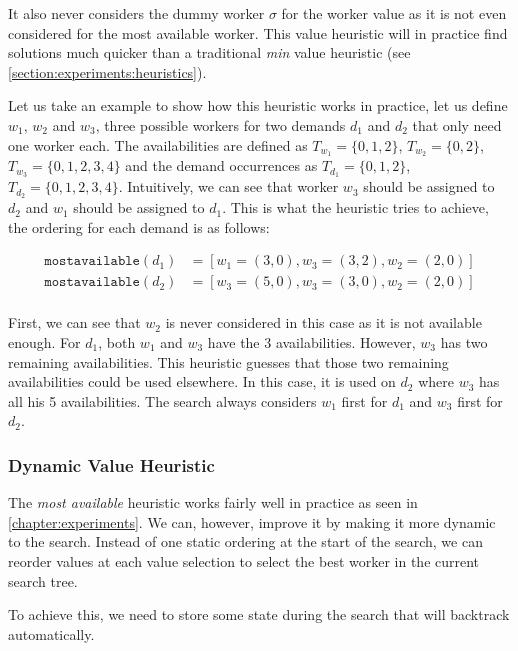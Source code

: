 \documentclass[../../thesis.tex]{subfiles}
\begin{document}
It also never considers the dummy worker $\sigma$ for the worker value as it is not even considered 
for the most available worker. This value heuristic will in practice find solutions much quicker than a traditional \emph{min} value heuristic 
(see \autoref{section:experiments:heuristics}).

Let us take an example to show how this heuristic works in practice, let us define 
$w_1$, $w_2$ and $w_3$, three possible workers for two demands $d_1$ and $d_2$ that only need one worker each.
The availabilities are defined as
$T_{w_1} = \{ 0, 1, 2 \}$, $T_{w_2} = \{ 0, 2 \}$, $T_{w_3} = \{ 0, 1, 2, 3, 4\}$ and the demand occurrences as 
$T_{d_1} = \{ 0, 1, 2 \}$, $T_{d_2} = \{ 0, 1, 2, 3, 4 \}$. Intuitively, we can see that worker 
$w_3$ should be assigned to $d_2$ and $w_1$ should be assigned to $d_1$. This is what the heuristic tries to achieve, the ordering for each demand is as follows:

\begin{align*}
  \texttt{mostavailable}(d_1) &= [w_1 = (3, 0), w_3 = (3, 2), w_2 = (2, 0)] \\ 
  \texttt{mostavailable}(d_2) &= [w_3 = (5, 0), w_3 = (3, 0), w_2 = (2, 0)] \\ 
\end{align*}

First, we can see that $w_2$ is never considered in this case as it is not available enough. For $d_1$, both $w_1$ and $w_3$ have the 3 availabilities. However, 
$w_3$ has two remaining availabilities. This heuristic guesses that those two remaining availabilities could be used elsewhere. In this case, it is used on $d_2$ where $w_3$ has all his 5 availabilities.
The search always considers $w_1$ first for $d_1$ and $w_3$ first for $d_2$.

\subsubsection{Dynamic Value Heuristic}

The \emph{most available} heuristic works fairly well in practice as seen in \autoref{chapter:experiments}. 
We can, however, improve it by making it more dynamic to the search. Instead of one static ordering at the start of the search,
we can reorder values at each value selection to select the best worker in the current search tree.

To achieve this, we need to store some state during the search that will backtrack automatically.
\end{document}
